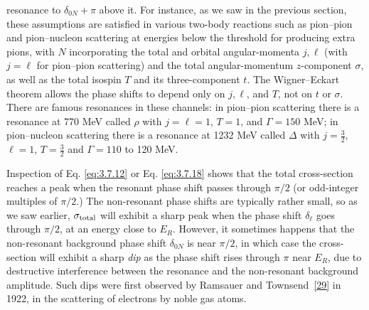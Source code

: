 
resonance to $\delta_{0N}+\pi$ above it. For instance, as we saw in the
previous section, these assumptions are satisfied in various two-body
reactions such as pion--pion and pion--nucleon scattering at energies below
the threshold for producing extra pions, with $N$ incorporating the total and
orbital angular-momenta $j,\ell$ (with $j=\ell$ for pion--pion scattering) and
the total angular-momentum $z$-component $\sigma$, as well as the total isospin
$T$ and its three-component $t$. The Wigner--Eckart theorem allows the phase
shifts to depend only on $j,\ell$, and $T$, not on $t$ or $\sigma$. There are
famous resonances in these channels: in pion--pion scattering there is a
resonance at 770 MeV called $\rho$ with $j=\ell=1$, $T=1$, and
$\Gamma=150$ MeV; in pion--nucleon scattering there is a resonance at
1232 MeV called $\Delta$ with $j=\tfrac32$, $\ell=1$, $T=\tfrac32$ and
$\Gamma=110$ to 120 MeV.

Inspection of Eq. \eqref{eq:3.7.12} or Eq. \eqref{eq:3.7.18} shows that the total cross-section
reaches a peak when the resonant phase shift passes through $\pi/2$ (or
odd-integer multiples of $\pi/2$.) The non-resonant phase shifts are typically
rather small, so as we saw earlier, $\sigma_{\rm total}$ will exhibit a sharp
peak when the phase shift $\delta_\ell$ goes through $\pi/2$, at an energy
close to $E_R$. However, it sometimes happens that the non-resonant background
phase shift $\delta_{0N}$ is near $\pi/2$, in which case the cross-section will
exhibit a sharp \emph{dip} as the phase shift rises through $\pi$ near $E_R$,
due to destructive interference between the resonance and the non-resonant
background amplitude. Such dips were first observed by Ramsauer and
Townsend~\hyperref[ref:3.29]{[29]} in 1922, in the scattering of electrons by noble gas atoms.


